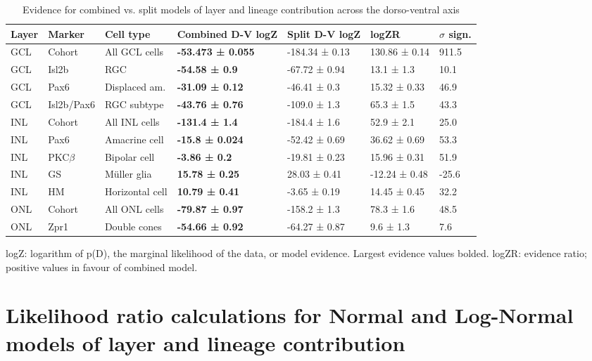 \begin{table}[!ht]
    \caption{Evidence for combined vs. split models of layer and lineage contribution across the dorso-ventral axis}
    \begin{tabular}{|l|l|l|l|l|l|l|} 
        \hline
        {\bf Layer} & {\bf Marker} & {\bf Cell type} & {\bf Combined D-V logZ} & {\bf Split D-V logZ} & {\bf logZR} & {\bf $\sigma$ sign.}\\ \hline \hline
        GCL & Cohort & All GCL cells & {\bf -53.473 ± 0.055} & -184.34 ± 0.13 & 130.86 ± 0.14 & 911.5\\ \hline \hline
        GCL & Isl2b & RGC & {\bf -54.58 ± 0.9} & -67.72 ± 0.94 & 13.1 ± 1.3 & 10.1\\ \hline
        GCL & Pax6 & Displaced am. & {\bf -31.09 ± 0.12} & -46.41 ± 0.3 & 15.32 ± 0.33 & 46.9\\ \hline
        GCL & Isl2b/Pax6 & RGC subtype & {\bf -43.76 ± 0.76} & -109.0 ± 1.3 & 65.3 ± 1.5 & 43.3\\ \hline \hline
        INL & Cohort & All INL cells & {\bf -131.4 ± 1.4} & -184.4 ± 1.6 & 52.9 ± 2.1 & 25.0\\ \hline \hline
        INL & Pax6 & Amacrine cell & {\bf -15.8 ± 0.024} & -52.42 ± 0.69 & 36.62 ± 0.69 & 53.3\\ \hline
        INL & PKC$\beta$ & Bipolar cell & {\bf -3.86 ± 0.2} & -19.81 ± 0.23 & 15.96 ± 0.31 & 51.9\\ \hline
        INL & GS & M\"{u}ller glia & {\bf 15.78 ± 0.25} & 28.03 ± 0.41 & -12.24 ± 0.48 & -25.6\\ \hline
        INL & HM & Horizontal cell & {\bf 10.79 ± 0.41} & -3.65 ± 0.19 & 14.45 ± 0.45 & 32.2\\ \hline \hline
        ONL & Cohort & All ONL cells & {\bf -79.87 ± 0.97} & -158.2 ± 1.3 & 78.3 ± 1.6 & 48.5\\ \hline \hline
        ONL & Zpr1 & Double cones & {\bf -54.66 ± 0.92} & -64.27 ± 0.87 & 9.6 ± 1.3 & 7.6\\ \hline
    \end{tabular}
\begin{flushleft}logZ: logarithm of p(D), the marginal likelihood of the data, or model evidence.  Largest evidence values bolded. logZR: evidence ratio; positive values in favour of combined model.
\end{flushleft}
\label{lineage_dvev}
\end{table}

\section{Likelihood ratio calculations for Normal and Log-Normal models of layer and lineage contribution}

